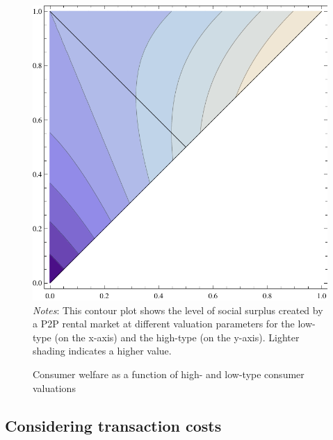 \documentclass[11pt]{article}
\begin{document}
\begin{figure}
\centering 
\caption{Consumer welfare as a function of high- and low-type consumer valuations}
\label{fig:welfare}
\begin{minipage}{0.50 \linewidth}
\includegraphics[width = \linewidth]{./plots/welfare.pdf} \\
\emph{Notes}: This contour plot shows the level of social surplus created by a P2P rental market at different valuation parameters for the low-type (on the x-axis) and the high-type (on the y-axis).
Lighter shading indicates a higher value. 
\end{minipage} 
\end{figure} 

\subsection{Considering transaction costs}

 
\end{document}
